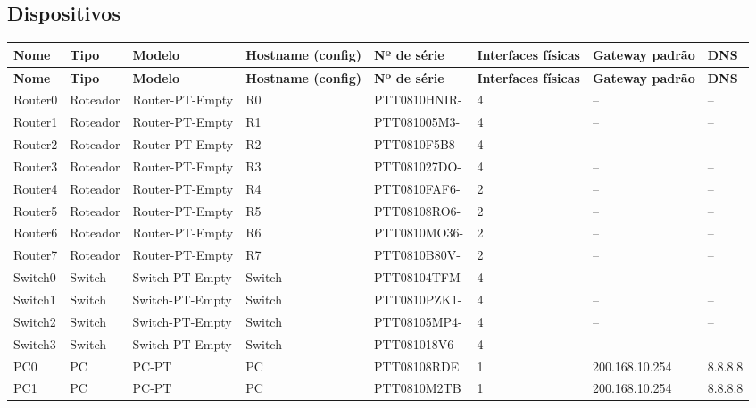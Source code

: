 \subsection{Dispositivos}
\begingroup\scriptsize\setlength{\tabcolsep}{3pt}
\begin{longtable}{@{}p{}p{}p{}p{}p{}p{}p{}p{}@{}}
\toprule \textbf{Nome} & \textbf{Tipo} & \textbf{Modelo} & \textbf{Hostname (config)} & \textbf{Nº de série} & \textbf{Interfaces físicas} & \textbf{Gateway padrão} & \textbf{DNS} \\\midrule\endfirsthead
\toprule \textbf{Nome} & \textbf{Tipo} & \textbf{Modelo} & \textbf{Hostname (config)} & \textbf{Nº de série} & \textbf{Interfaces físicas} & \textbf{Gateway padrão} & \textbf{DNS} \\\midrule\endhead
Router0 & Roteador & Router-PT-Empty & R0 & PTT0810HNIR- & 4 & -- & -- \\
Router1 & Roteador & Router-PT-Empty & R1 & PTT081005M3- & 4 & -- & -- \\
Router2 & Roteador & Router-PT-Empty & R2 & PTT0810F5B8- & 4 & -- & -- \\
Router3 & Roteador & Router-PT-Empty & R3 & PTT081027DO- & 4 & -- & -- \\
Router4 & Roteador & Router-PT-Empty & R4 & PTT0810FAF6- & 2 & -- & -- \\
Router5 & Roteador & Router-PT-Empty & R5 & PTT08108RO6- & 2 & -- & -- \\
Router6 & Roteador & Router-PT-Empty & R6 & PTT0810MO36- & 2 & -- & -- \\
Router7 & Roteador & Router-PT-Empty & R7 & PTT0810B80V- & 2 & -- & -- \\
Switch0 & Switch & Switch-PT-Empty & Switch & PTT08104TFM- & 4 & -- & -- \\
Switch1 & Switch & Switch-PT-Empty & Switch & PTT0810PZK1- & 4 & -- & -- \\
Switch2 & Switch & Switch-PT-Empty & Switch & PTT08105MP4- & 4 & -- & -- \\
Switch3 & Switch & Switch-PT-Empty & Switch & PTT081018V6- & 4 & -- & -- \\
PC0 & PC & PC-PT & PC & PTT08108RDE & 1 & 200.168.10.254 & 8.8.8.8 \\
PC1 & PC & PC-PT & PC & PTT0810M2TB & 1 & 200.168.10.254 & 8.8.8.8 \\

\end{longtable}
